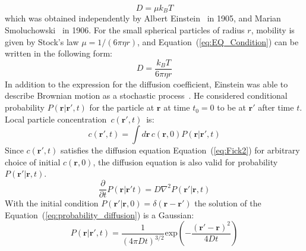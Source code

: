 \begin{equation}\label{eq:Einstein-Smoluchowski}
D=\mu k_BT
\end{equation}
which was obtained independently by Albert Einstein~\cite{Einstein} in 1905, and Marian Smoluchowski~\cite{Smoluchowski} in 1906. 
For the small spherical particles of radius $r$, mobility is given by Stock's law $\mu=1/{(6\pi\eta r)}$, and Equation~(\ref{eq:EQ_Condition}) can be written in the following form:
\begin{equation}\label{eq:Einstein-Stocks}
D=\frac{k_BT}{6\pi\eta r}
\end{equation}
In addition to the expression for the diffusion coefficient, Einstein was able to describe  Brownian motion as a stochastic process~\cite{Einstein}. 
He considered conditional probability $P(\mathbf{r}|\mathbf{r'},t)$ for the particle at $\mathbf{r}$ at time $t_0=0$ to be at $\mathbf{r'}$ after time $t$. 
Local particle concentration~$c(\mathbf{r'}, t)$~is:
\begin{equation}\label{eq:probability_concentration}
c(\mathbf{r'},t)=\int d\mathbf{r} \, c(\mathbf{r},0)P(\mathbf{r}|\mathbf{r'},t)
\end{equation}
Since $c(\mathbf{r'},t)$ satisfies the diffusion equation Equation~(\ref{eq:Fick2}) for arbitrary choice of initial $c(\mathbf{r},0)$, the diffusion equation is also valid for probability $P(\mathbf{r'}|\mathbf{r}, t)$.
\begin{equation}\label{eq:probability_diffusion}
\frac{\partial}{\partial t}P(\mathbf{r}|\mathbf{r'}t)=D\nabla^2P(\mathbf{r'}|\mathbf{r}, t)
\end{equation}
With the initial condition $P(\mathbf{r'}|\mathbf{r}, 0)=\delta(\mathbf{r}-\mathbf{r'})$ the solution of the Equation~(\ref{eq:probability_diffusion}) is a Gaussian:
\begin{equation}\label{eq:probability}
P(\mathbf{r}|\mathbf{r'},t)=\frac{1}{(4\pi Dt)^{3/2}} \mathrm{exp}\left( -\frac{(\mathbf{r'}-\mathbf{r})^2}{4Dt}\right)
\end{equation}
